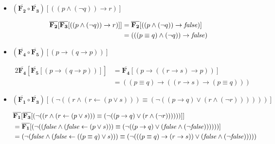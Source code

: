 \documentclass{article}
\newcommand{\val}[2]{\mathbf{#1}[#2]}
\newlength{\logicv}
\newenvironment{logicenv}[2][0]{
  \begin{tcolorbox}[demo, title = #2]
  \vspace*{#1\logicv}
}{
  \end{tcolorbox}
}
\begin{document}
\begin{itemize}
    \item $\val{(\overline{F_2} \circ \overline{F_3})}{((p \land (\neg q)) \to r)}$
    
    \begin{logicenv}{Punto 2}
        \begin{alignat*}{2}
            \val{\overline{F_2}}{\val{\overline{F_3}}{((p \land (\neg q)) \to r)}} &= \val{\overline{F_2}}{((p \land (\neg q)) \to \textrm{\textit{false}})}\\
            & = (((p \equiv q) \land (\neg q)) \to \textrm{\textit{false}})
        \end{alignat*}
    \end{logicenv}

    \item $\val{(\overline{F_4} \circ \overline{F_5})}{(p \to (q \to p))}$
    
    \begin{logicenv}{Punto 2}
        \begin{alignat*}{2}
            \val{\overline{F_4}}{\val{\overline{F_5}}{(p \to (q \to p))}} &= \val{\overline{F_4}}{(p \to ((r \to s) \to p))}\\
            & = ((p \equiv q) \to ((r \to s) \to (p \equiv q)))
        \end{alignat*}
    \end{logicenv}

    \item $\val{(\overline{F_1} \circ \overline{F_3})}{(\neg ((r \land (r \gets (p \lor s))) \equiv (\neg ((p \to q) \lor (r \land (\neg r))))))}$
    
    \begin{logicenv}{Punto 2}
        \begin{alignat*}{2}
            &\val{\overline{F_1}}{\val{\overline{F_3}}{(\neg ((r \land (r \gets (p \lor s))) \equiv (\neg ((p \to q) \lor (r \land (\neg r))))))}} \\
            &= \val{\overline{F_1}}{(\neg ((\textrm{\textit{false}} \land (\textrm{\textit{false}} \gets (p \lor s))) \equiv (\neg ((p \to q) \lor (\textrm{\textit{false}} \land (\neg \textrm{\textit{false}}))))))}\\
            & = (\neg (\textrm{\textit{false}} \land (\textrm{\textit{false}} \gets ((p \equiv q) \lor s))) \equiv (\neg (((p \equiv q) \to (r \to s)) \lor (\textrm{\textit{false}} \land (\neg \textrm{\textit{false}})))))
        \end{alignat*}
    \end{logicenv}
\end{itemize}
\end{document}
